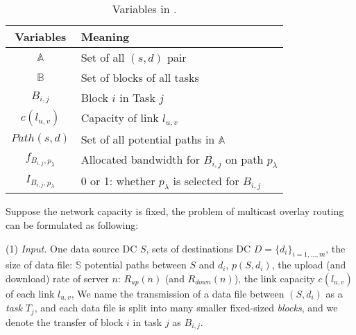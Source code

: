 \begin{table}[t]
\begin{center}
\begin{tabular}{| c | l|}
\hline
 \rowcolor[gray]{0.9}
\textbf{Variables} & \textbf{Meaning} \\
\hline \hline
\textit{$\mathbb{A}$} & Set of all $(s, d)$ pair\\
\hline
\textit{$\mathbb{B}$} & Set of blocks of all tasks\\
\hline
\textit{$B_{i,j}$} & Block $i$ in Task $j$\\
\hline
\textit{$c(l_{u,v})$} & Capacity of link $l_{u,v}$\\
\hline
\textit{$Path(s,d)$} & Set of all potential paths in $\mathbb{A}$\\
\hline
\textit{$f_{B_{i,j},p_\lambda}$} & Allocated bandwidth for $B_{i,j}$ on path $p_\lambda$\\
\hline
\textit{$I_{B_{i,j},p_\lambda}$} & 0 or 1: whether $p_\lambda$ is selected for $B_{i,j}$\\
\hline
\end{tabular}
\end{center}
\caption{Variables in \name.}
\label{table:para}
\end{table}

Suppose the network capacity is fixed, the problem of multicast
overlay routing can be formulated as following:

\noindent(1) {\em Input.}
One data source DC $S$, sets of destinations DC
$D=\{d_i\}_{i=1,\dots,m}$,
the size of data file: $\mathbb{S}$
potential paths between $S$ and $d_i$, $p(S,d_i)$,
the upload (and download) rate of server $n$: $R_{up}(n)$
(and $R_{down}(n)$),
the link capacity  $c(l_{u,v})$ of each link $l_{u,v}$,
We name the transmission of a data file between $(S,d_i)$
as a {\em task} $T_j$, and each data file is split into
many smaller fixed-sized {\em blocks}, and we denote
the transfer of block $i$ in task $j$ as $B_{i,j}$.


